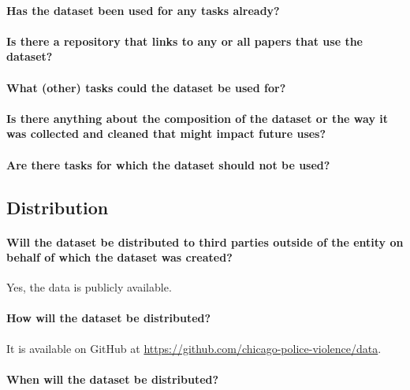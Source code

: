 \paragraph{Has the dataset been used for any tasks already?}

\paragraph{Is there a repository that links to any or all papers that use the dataset?}

\paragraph{What (other) tasks could the dataset be used for?}

\paragraph{Is there anything about the composition of the dataset or the way it was collected and cleaned that might impact future uses?}

\paragraph{Are there tasks for which the dataset should not be used?}

\subsection{Distribution}

\paragraph{Will the dataset be distributed to third parties outside of the entity on behalf of which the dataset was created?}

Yes, the data is publicly available.

\paragraph{How will the dataset be distributed?}

It is available on GitHub at \url{https://github.com/chicago-police-violence/data}.

\paragraph{When will the dataset be distributed?}

